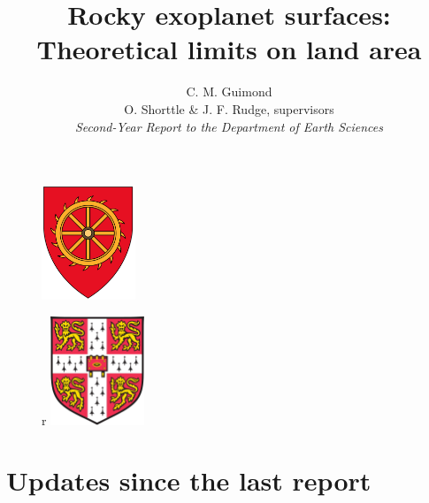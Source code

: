 \documentclass[10pt,a4paper]{article}
\author{C. M. Guimond \\ \normalsize O. Shorttle \& J. F. Rudge, supervisors \\ \textit{Second-Year Report to the Department of Earth Sciences}}
\title{Rocky exoplanet surfaces: \\ \large Theoretical limits on land area}
\begin{document}
\begin{figure}
    \centering
    \begin{minipage}{0.5\textwidth}
        \centering
        \includegraphics[width=0.25\textwidth]{cats} %
    \end{minipage}\hfill
    \begin{minipage}{0.5\textwidth}
       r \centering
        \includegraphics[width=0.25\textwidth]{cam} %
    \end{minipage}
\end{figure}

\maketitle
\tableofcontents


\section{Updates since the last report}
\end{document}

